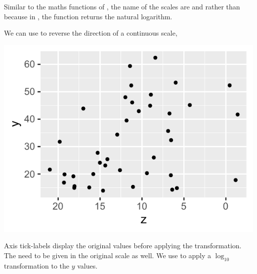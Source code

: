 \documentclass[krantz2]{krantz}\usepackage{knitr}
\begin{document}
\begin{warningbox}
  Similar to the maths functions of \Rlang, the name of the scales are  and  rather than  because in \Rlang, the function  returns the natural logarithm.
\end{warningbox}

We can use  to reverse the direction of a continuous scale,

\begin{knitrout}\footnotesize
{}\color{fgcolor}\begin{kframe}
\begin{alltt}
  \hlopt{+}
  \hlstd{()} \hlopt{+}
  \hlstd{()}
\end{alltt}
\end{kframe}

{\centering \includegraphics[width=.54\textwidth]{figure/pos-scale-trans-01-1}

}



\end{knitrout}

Axis tick-labels display the original values before applying the transformation. The  need to be given in the original scale as well. We use  to apply a $\log_{10}$ transformation to the $y$ values.

\begin{knitrout}\footnotesize
{}\color{fgcolor}\begin{kframe}
\begin{alltt}
  \hlstd{(}\hlstd{=}\hlstd{(}\hlstd{,}\hlstd{,}\hlstd{,}\hlstd{))}
\end{alltt}
\end{kframe}
\end{knitrout}
\end{document}
